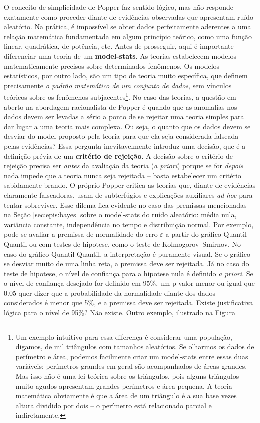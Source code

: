 \documentclass[./main.tex]{subfiles}
\begin{document}
\par O conceito de simplicidade de Popper faz sentido lógico, mas não responde exatamente como proceder diante de evidências observadas que apresentam ruído aleatório. Na prática, é impossível se obter dados perfeitamente aderentes a uma relação matemática fundamentada em algum princípio teórico, como uma função linear, quadrática, de potência, etc. Antes de prosseguir, aqui é importante diferenciar uma  \gls{teoria} de um \textbf{\gls{model-stats}}. As teorias estabelecem modelos matematicamente precisos sobre determinados fenômenos. Os modelos estatísticos, por outro lado, são um tipo de \gls{teoria} muito específica, que definem precisamente \textit{o padrão matemático de um conjunto de dados}, sem vínculos teóricos sobre os fenômenos subjacentes\footnote{Um exemplo intuitivo para essa diferença é considerar uma população, digamos, de mil triângulos com tamanhos aleatórios. Se olharmos os dados de perímetro e área, podemos facilmente criar um \gls{model-stats} entre essas duas variáveis: perímetros grandes em geral são acompanhados de áreas grandes. Mas isso não é uma lei teórica sobre os triângulos, pois alguns triângulos muito agudos apresentam grandes perímetros e área pequena. A \gls{teoria} matemática obviamente é que a área de um triângulo é a sua base vezes altura dividido por dois -- o perímetro está relacionado parcial e indiretamente.}. No caso das teorias, a questão em aberto na abordagem racionalista de Popper é quando que as anomalias nos dados devem ser levadas a sério a ponto de se rejeitar uma \gls{teoria} simples para dar lugar a uma \gls{teoria} mais complexa. Ou seja, o quanto que os dados devem se desviar do \gls{model} proposto pela \gls{teoria} para que ela seja considerada falseada pelas evidências? Essa pergunta inevitavelmente introduz uma decisão, que é a definição prévia de um \textbf{critério de rejeição}. A decisão sobre o critério de rejeição precisa ser \textit{antes} da avaliação da \gls{teoria} (\textit{a priori}) porque se for \textit{depois} nada impede que a \gls{teoria} nunca seja rejeitada -- basta estabelecer um critério sabidamente brando. O próprio Popper critica as teorias que, diante de evidências claramente falseadoras, usam de subterfúgios e explicações auxiliares \textit{ad hoc} para tentar sobreviver. Esse dilema fica evidente no caso das premissas mencionadas na Seção \ref{sec:epis:bayes} sobre o \gls{model-stats} do ruído aleatório: média nula, variância constante, independência no tempo e distribuição normal. Por exemplo, pode-se avaliar a premissa de normalidade do erro $\varepsilon$ a partir do gráfico Quantil-Quantil ou com testes de \gls{hipotese}, como o teste de Kolmogorov–Smirnov. No caso do gráfico Quantil-Quantil, a interpretação é puramente visual. Se o gráfico se desviar muito de uma linha reta, a premissa deve ser rejeitada. Já no caso do teste de \gls{hipotese}, o nível de confiança para a \gls{hipotese} nula é definido \textit{a priori}. Se o nível de confiança desejado for definido em 95\%, um p-valor menor ou igual que 0.05 quer dizer que a probabilidade da normalidade diante dos dados considerados é menor que 5\%, e a premissa deve ser rejeitada. Existe justificativa lógica para o nível de 95\%? Não existe. Outro exemplo, ilustrado na Figura 
\end{document}
